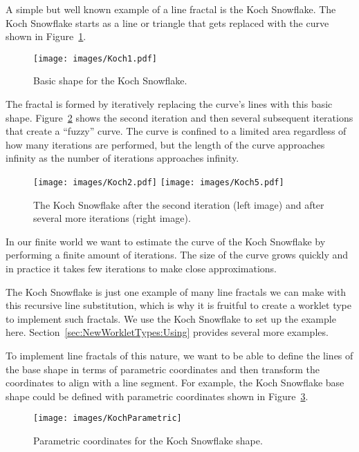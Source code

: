 A simple but well known example of a line fractal is the  Koch Snowflake.
The Koch Snowflake starts as a line or triangle that gets replaced with the curve shown in Figure~\ref{fig:KochShape}.

\begin{figure}[htb]
  \centering
  \texttt{[image: images/Koch1.pdf]}
  \caption{Basic shape for the Koch Snowflake.}
  \label{fig:KochShape}
\end{figure}

The fractal is formed by iteratively replacing the curve's lines with this basic shape.
Figure~\ref{fig:KochIterations} shows the second iteration and then several subsequent iterations that create a ``fuzzy'' curve.
The curve is confined to a limited area regardless of how many iterations are performed, but the length of the curve approaches infinity as the number of iterations approaches infinity.

\begin{figure}[htb]
  \centering
  \texttt{[image: images/Koch2.pdf]}
  \texttt{[image: images/Koch5.pdf]}
  \caption{
    The Koch Snowflake after the second iteration (left image) and after several more iterations (right image).
  }
  \label{fig:KochIterations}
\end{figure}

In our finite world we want to estimate the curve of the Koch Snowflake by performing a finite amount of iterations.
The size of the curve grows quickly and in practice it takes few iterations to make close approximations.

\begin{didyouknow}
  The Koch Snowflake is just one example of many line fractals we can make with this recursive line substitution, which is why it is fruitful to create a worklet type to implement such fractals.
  We use the Koch Snowflake to set up the example here.
  Section~\ref{sec:NewWorkletTypes:Using} provides several more examples.
\end{didyouknow}

To implement line fractals of this nature, we want to be able to define the lines of the base shape in terms of parametric coordinates and then transform the coordinates to align with a line segment.
For example, the Koch Snowflake base shape could be defined with parametric coordinates shown in Figure~\ref{fig:KochParametric}.

\begin{figure}[htb]
  \centering
  \texttt{[image: images/KochParametric]}
  \caption{Parametric coordinates for the Koch Snowflake shape.}
  \label{fig:KochParametric}
\end{figure}

